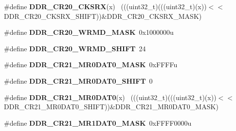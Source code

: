 \begin{DoxyCompactItemize}
\item 
\hypertarget{group___d_d_r___register___masks_gaa6b8f5615f42320bf9b749bf801e91ee}{}\#define {\bfseries D\+D\+R\+\_\+\+C\+R20\+\_\+\+C\+K\+S\+R\+X}(x)                                            ~(((uint32\+\_\+t)(((uint32\+\_\+t)(x))$<$$<$D\+D\+R\+\_\+\+C\+R20\+\_\+\+C\+K\+S\+R\+X\+\_\+\+S\+H\+I\+F\+T))\&D\+D\+R\+\_\+\+C\+R20\+\_\+\+C\+K\+S\+R\+X\+\_\+\+M\+A\+S\+K)\label{group___d_d_r___register___masks_gaa6b8f5615f42320bf9b749bf801e91ee}

\item 
\hypertarget{group___d_d_r___register___masks_ga90daea83d3ce1e37b57c4ac0e00f0291}{}\#define {\bfseries D\+D\+R\+\_\+\+C\+R20\+\_\+\+W\+R\+M\+D\+\_\+\+M\+A\+S\+K}~0x1000000u\label{group___d_d_r___register___masks_ga90daea83d3ce1e37b57c4ac0e00f0291}

\item 
\hypertarget{group___d_d_r___register___masks_ga2169bd402223b8666d07a7ffa00cad8a}{}\#define {\bfseries D\+D\+R\+\_\+\+C\+R20\+\_\+\+W\+R\+M\+D\+\_\+\+S\+H\+I\+F\+T}~24\label{group___d_d_r___register___masks_ga2169bd402223b8666d07a7ffa00cad8a}

\item 
\hypertarget{group___d_d_r___register___masks_ga07b836b8df6b45c990baf17453263d11}{}\#define {\bfseries D\+D\+R\+\_\+\+C\+R21\+\_\+\+M\+R0\+D\+A\+T0\+\_\+\+M\+A\+S\+K}~0x\+F\+F\+F\+Fu\label{group___d_d_r___register___masks_ga07b836b8df6b45c990baf17453263d11}

\item 
\hypertarget{group___d_d_r___register___masks_ga426753174a7964080f7aa64ca42264fa}{}\#define {\bfseries D\+D\+R\+\_\+\+C\+R21\+\_\+\+M\+R0\+D\+A\+T0\+\_\+\+S\+H\+I\+F\+T}~0\label{group___d_d_r___register___masks_ga426753174a7964080f7aa64ca42264fa}

\item 
\hypertarget{group___d_d_r___register___masks_ga853a97d7bddb2864b84662f3f30d94f6}{}\#define {\bfseries D\+D\+R\+\_\+\+C\+R21\+\_\+\+M\+R0\+D\+A\+T0}(x)                                        ~(((uint32\+\_\+t)(((uint32\+\_\+t)(x))$<$$<$D\+D\+R\+\_\+\+C\+R21\+\_\+\+M\+R0\+D\+A\+T0\+\_\+\+S\+H\+I\+F\+T))\&D\+D\+R\+\_\+\+C\+R21\+\_\+\+M\+R0\+D\+A\+T0\+\_\+\+M\+A\+S\+K)\label{group___d_d_r___register___masks_ga853a97d7bddb2864b84662f3f30d94f6}

\item 
\hypertarget{group___d_d_r___register___masks_gaa0e9862b87d30e431b5625901754fcad}{}\#define {\bfseries D\+D\+R\+\_\+\+C\+R21\+\_\+\+M\+R1\+D\+A\+T0\+\_\+\+M\+A\+S\+K}~0x\+F\+F\+F\+F0000u\label{group___d_d_r___register___masks_gaa0e9862b87d30e431b5625901754fcad}


\end{DoxyCompactItemize}
